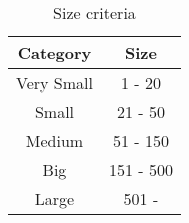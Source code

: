 \begin{table}[t]
\centering
\caption{Size criteria}
\begin{tabular}{c|c}
\hline
\textbf{Category}   & \textbf{Size}      \\ \hline
Very Small & 1 - 20    \\ \hline
Small      & 21 - 50   \\ \hline
Medium     & 51 - 150  \\ \hline
Big        & 151 - 500 \\ \hline
Large      & 501 -       \\ \hline
\end{tabular}
\label{table: size criteria}
\end{table}